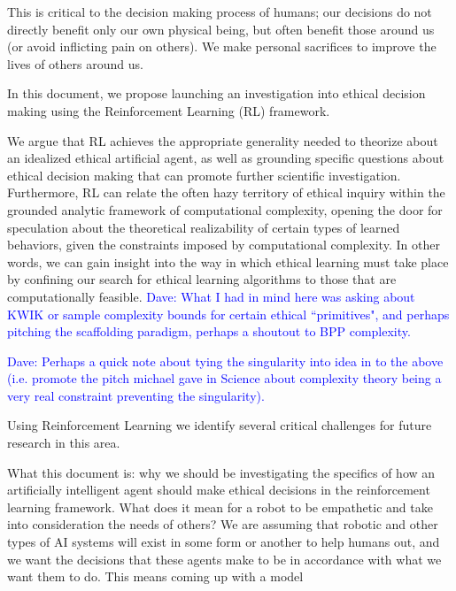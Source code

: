 \documentclass[11pt]{article}
\newcommand\davenote[1]{\textcolor{blue}{Dave: #1}}
\begin{document}
This is critical to the decision making process of humans; our decisions do not directly benefit only our own physical being, but often benefit those around us (or avoid inflicting pain on others). We make personal sacrifices to improve the lives of others around us.

In this document, we propose launching an investigation into ethical decision making using the Reinforcement Learning (RL) framework.

We argue that RL achieves the appropriate generality needed to theorize about an idealized ethical artificial agent, as well as grounding specific questions about ethical decision making that can promote further scientific investigation.
Furthermore, RL can relate the often hazy territory of ethical inquiry within the grounded analytic framework of computational complexity, opening the door for speculation about the theoretical realizability of certain types of learned behaviors, given the constraints imposed by computational complexity.
In other words, we can gain insight into the way in which ethical learning must take place by confining our search for ethical learning algorithms to those that are computationally feasible. \davenote{What I had in mind here was asking about KWIK or sample complexity bounds for certain ethical ``primitives", and perhaps pitching the scaffolding paradigm, perhaps a shoutout to BPP complexity.}

\davenote{Perhaps a quick note about tying the singularity into idea in to the above (i.e. promote the pitch michael gave in Science about complexity theory being a very real constraint preventing the singularity).}

Using Reinforcement Learning we identify several critical challenges for future research in this area.

What this document is: why we should be investigating the specifics of how an artificially intelligent agent should make ethical decisions in the reinforcement learning framework. What does it mean for a robot to be empathetic and take into consideration the needs of others? We are assuming that robotic and other types of AI systems will exist in some form or another to help humans out, and we want the decisions that these agents make to be in accordance with what we want them to do. This means coming up with a model 
\end{document}
